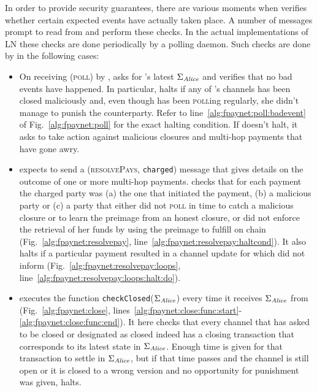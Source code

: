   In order to provide security guarantees, there are various moments when
  \fpaynet{} verifies whether certain expected events have actually taken place.
  A number of messages prompt \fpaynet{} to read from \ledger{} and perform
  these checks. In the actual implementations of LN these checks are done
  periodically by a polling daemon. Such checks are done by \fpaynet{} in the
  following cases:
  \begin{itemize}
    \item On receiving (\textsc{poll}) by \alice, \fpaynet{} asks \ledger{} for
    \alice's latest $\Sigma_{\mathit{Alice}}$ and verifies that no bad events have
    happened. In particular, \fpaynet{} halts if any of \alice's channels has
    been closed maliciously and, even though \alice{} has been \textsc{poll}ing
    regularly, she didn't manage to punish the counterparty. Refer to
    line~\ref{alg:fpaynet:poll:badevent} of Fig.~\ref{alg:fpaynet:poll} for the
    exact halting condition. If \fpaynet{} doesn't halt, it asks \simulator{} to
    take action against malicious closures and multi-hop payments that have gone
    awry.
    \item \fpaynet{} expects \simulator{} to send a (\textsc{resolvePays},
    \texttt{charged}) message that gives details on the outcome of one or more
    multi-hop payments. \fpaynet{} checks that for each payment the charged
    party was (a) the one that initiated the payment, (b) a malicious party or
    (c) a party that either did not \textsc{poll} in time to catch a malicious
    closure or to learn the preimage from an honest closure, or did not enforce
    the retrieval of her funds by using the preimage to fulfill on chain
    (Fig.~\ref{alg:fpaynet:resolvepay},
    line~\ref{alg:fpaynet:resolvepay:haltcond}).  It also halts if a particular payment resulted in a channel
    update for which \simulator{} did not inform \fpaynet{}
    (Fig.~\ref{alg:fpaynet:resolvepay:loops},
    line~\ref{alg:fpaynet:resolvepay:loops:halt:do}).
    \item \fpaynet{} executes the function
    \texttt{checkClosed}($\Sigma_{\mathit{Alice}}$) every time it receives
    $\Sigma_{\mathit{Alice}}$ from \ledger{} (Fig.~\ref{alg:fpaynet:close},
    lines~\ref{alg:fpaynet:close:func:start}-\ref{alg:fpaynet:close:func:end}).
    It here checks that every channel that \environment{} has asked to be closed
    or \simulator{} designated as closed indeed has a closing transaction that
    corresponds to its latest state in $\Sigma_{\mathit{Alice}}$. Enough time is given
    for that transaction to settle in $\Sigma_{\mathit{Alice}}$, but if that time passes
    and the channel is still open or it is closed to a wrong version and no
    opportunity for punishment was given, \fpaynet{} halts.
  \end{itemize}

